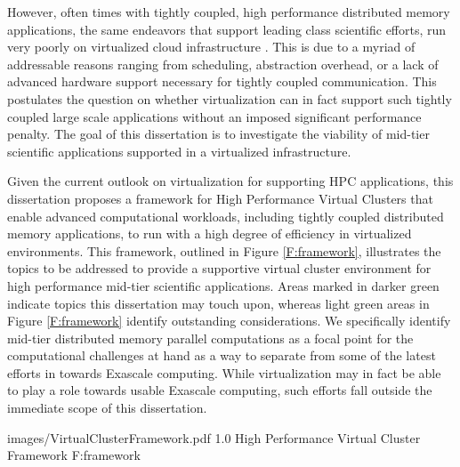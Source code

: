 However, often times with tightly coupled, high performance distributed memory applications, the same endeavors that support leading class scientific efforts, run very poorly on virtualized cloud infrastructure \cite{ostermann2009performance}.  This is due to a myriad of addressable reasons ranging from scheduling, abstraction overhead, or a lack of advanced hardware support necessary for tightly coupled communication. This postulates the question on whether virtualization can in fact support such tightly coupled large scale applications without an imposed significant performance penalty. The goal of this dissertation is to investigate the viability of mid-tier scientific applications supported in a virtualized infrastructure.   



Given the current outlook on virtualization for supporting HPC applications, this dissertation proposes a framework for High Performance Virtual Clusters that enable advanced computational workloads, including tightly coupled distributed memory applications, to run with a high degree of efficiency  in virtualized environments. This framework, outlined in Figure \ref{F:framework}, illustrates the topics to be addressed to provide a supportive virtual cluster environment for high performance mid-tier scientific applications.  Areas marked in darker green indicate topics this dissertation may touch upon, whereas light green areas in Figure \ref{F:framework} identify outstanding considerations. We specifically identify mid-tier distributed memory parallel computations as a focal point for the computational challenges at hand as a way to separate from some of the latest efforts in towards Exascale \cite{dongarra2011exascale, bergman2008exascale, shalf2010exascale} computing.  While virtualization may in fact be able to play a role towards usable Exascale computing, such efforts fall outside the immediate scope of this dissertation. 


  {images/VirtualClusterFramework.pdf}
  {1.0}
  {High Performance Virtual Cluster Framework}
  {F:framework}

